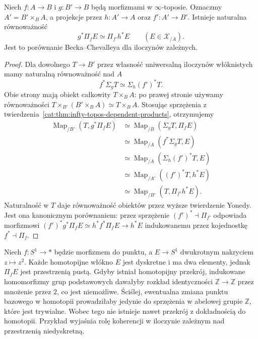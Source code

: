 \begin{stwierdzenie}\label{cat:prop:infty-topos-dependent-beck-chevalley}
Niech $f:A\to B$ i $g:B'\to B$ będą morfizmami w $\infty$-toposie. Oznaczmy $A'=B'\times_B A$, a projekcje przez $h:A'\to A$ oraz $f':A'\to B'$. Istnieje naturalna równoważność
\[
 g^*\Pi_f E\simeq\Pi_{f'}h^*E
 \qquad(E\in\mathcal X_{/A}).
\]
Jest to porównanie Becka--Chevalleya dla iloczynów zależnych.
\end{stwierdzenie}
\begin{proof}
Dla dowolnego $T\to B'$ przez własność uniwersalną iloczynów włóknistych mamy naturalną równoważność nad $A$
\[
 f^*\Sigma_g T\simeq\Sigma_h(f')^*T.
\]
Obie strony mają obiekt całkowity $T\times_B A$: po prawej stronie używamy równoważności $T\times_{B'}(B'\times_B A)\simeq T\times_B A$. Stosując sprzężenia z twierdzenia~\ref{cat:thm:infty-topos-dependent-products}, otrzymujemy
\[
\begin{aligned}
 \operatorname{Map}_{/B'}(T,g^*\Pi_f E)
 &\simeq\operatorname{Map}_{/B}(\Sigma_g T,\Pi_f E)\\
 &\simeq\operatorname{Map}_{/A}(f^*\Sigma_g T,E)\\
 &\simeq\operatorname{Map}_{/A}(\Sigma_h(f')^*T,E)\\
 &\simeq\operatorname{Map}_{/A'}((f')^*T,h^*E)\\
 &\simeq\operatorname{Map}_{/B'}(T,\Pi_{f'}h^*E).
\end{aligned}
\]
Naturalność w $T$ daje równoważność obiektów przez wyższe twierdzenie Yonedy. Jest ona kanonicznym porównaniem: przez sprzężenie $(f')^*\dashv\Pi_{f'}$ odpowiada morfizmowi $(f')^*g^*\Pi_f E\simeq h^*f^*\Pi_f E\to h^*E$ indukowanemu przez kojednostkę $f^*\dashv\Pi_f$.
\end{proof}

\begin{przyklad}\label{cat:ex:infty-topos-dependent-cover}
Niech $f:S^1\to *$ będzie morfizmem do punktu, a $E\to S^1$ dwukrotnym nakryciem $z\mapsto z^2$. Każde homotopijne włókno $E$ jest dyskretne i ma dwa elementy, jednak $\Pi_f E$ jest przestrzenią pustą. Gdyby istniał homotopijny przekrój, indukowane homomorfizmy grup podstawowych dawałyby rozkład identyczności $\mathbb Z\to\mathbb Z$ przez mnożenie przez $2$, co jest niemożliwe. Ściślej, ewentualna zmiana punktu bazowego w homotopii prowadziłaby jedynie do sprzężenia w abelowej grupie $\mathbb Z$, które jest trywialne. Wobec tego nie istnieje nawet przekrój z dokładnością do homotopii. Przykład wyjaśnia rolę koherencji w iloczynie zależnym nad przestrzenią niedyskretną.
\end{przyklad}

